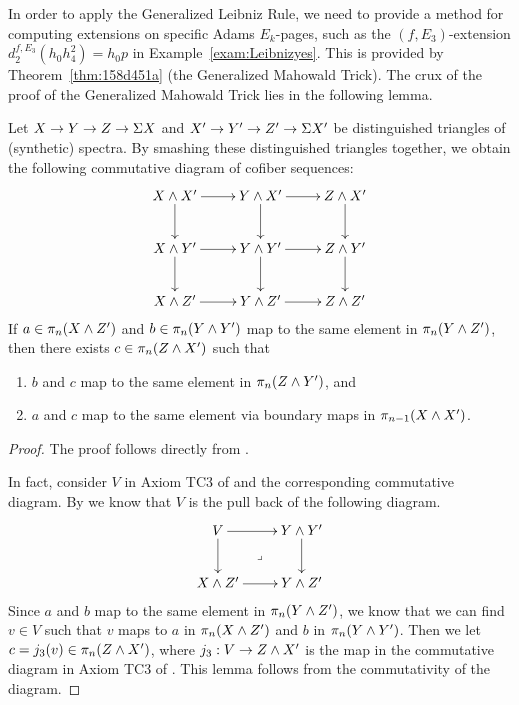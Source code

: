 \documentclass{amsart}
\numberwithin{equation}{section}
\begin{document}
In order to apply the Generalized Leibniz Rule, we need to provide a method for computing extensions on specific Adams $E_k$-pages, such as the $(f, E_3)$-extension $d_2^{f, E_3} (h_0h_4^2) = h_0 p$ in Example~\ref{exam:Leibnizyes}. This is provided by Theorem~\ref{thm:158d451a} (the Generalized Mahowald Trick). The crux of the proof of the Generalized Mahowald Trick lies in the following lemma.
\begin{lemma}\label{lem:452d218c}
    Let $X\to Y\to Z\to \Sigma X$ and $X'\to Y'\to Z'\to \Sigma X'$ be distinguished triangles of (synthetic) spectra. By smashing these distinguished triangles together, we obtain the following commutative diagram of cofiber sequences:
    $$\xymatrix{
    X\sma X' \ar[r] \ar[d] & Y\sma X' \ar[r] \ar[d] & Z\sma X' \ar[d]\\
    X\sma Y' \ar[d] \ar[r] & Y\sma Y' \ar[d] \ar[r] & Z\sma Y' \ar[d]\\
    X\sma Z' \ar[r] & Y\sma Z' \ar[r] & Z\sma Z'\\
    }$$
    If $a\in \pi_n(X\wedge Z')$ and $b\in\pi_n(Y\wedge Y')$ map to the same element in $\pi_n(Y\wedge Z')$, then there exists $c\in \pi_n(Z\wedge X')$ such that
    \begin{enumerate}
        \item $b$ and $c$ map to the same element in $\pi_n(Z\wedge Y')$, and
        \item $a$ and $c$ map to the same element via boundary maps in $\pi_{n-1}(X\wedge X')$.
    \end{enumerate}
\end{lemma}

\begin{proof}
The proof follows directly from \cite[Lemma 4.6]{May01}.

In fact, consider $V$ in Axiom TC3 of \cite[Section 4]{May01} and the corresponding commutative diagram. By \cite[Lemma 4.6]{May01} we know that $V$ is the pull back of the following diagram.
$$\xymatrix{
\ar@{}[dr]|\lrcorner V\ar[d]\ar[r]& Y\sma Y'\ar[d]\\
X\sma Z'\ar[r] & Y\sma Z'
}$$
Since $a$ and $b$ map to the same element in $\pi_n(Y\wedge Z')$, we know that we can find $v\in V$ such that $v$ maps to $a$ in $\pi_n(X\wedge Z')$ and $b$ in $\pi_n(Y\wedge Y')$. Then we let $c=j_3(v)\in \pi_n(Z\wedge X')$, where $j_3: V \rightarrow Z \wedge X'$ is the map in the commutative diagram in Axiom TC3 of \cite[Section 4]{May01}. This lemma follows from the commutativity of the diagram.
\end{proof}
 
\end{document}
